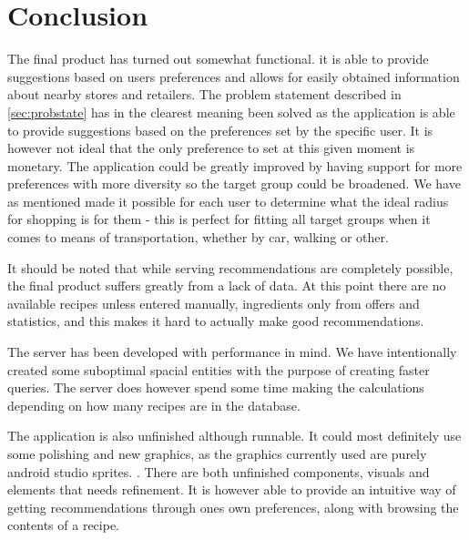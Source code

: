 \chapter{Conclusion}
\label{chap:conc}

The final product has turned out somewhat functional. it is able to provide suggestions based on users preferences and allows for easily obtained information about nearby stores and retailers. The problem statement described in \ref{sec:probstate} has in the clearest meaning been solved as the application is able to provide suggestions based on the preferences set by the specific user. It is however not ideal that the only preference to set at this given moment is monetary. The application could be greatly improved by having support for more preferences with more diversity so the target group could be broadened. We have as mentioned made it possible for each user to determine what the ideal radius for shopping is for them - this is perfect for fitting all target groups when it comes to means of transportation, whether by car, walking or other.

It should be noted that while serving recommendations are completely possible, the final product suffers greatly from a lack of data. At this point there are no available recipes unless entered manually, ingredients only from offers and statistics, and this makes it hard to actually make good recommendations.

The server has been developed with performance in mind. We have intentionally created some suboptimal spacial entities with the purpose of creating faster queries. The server does however spend some time making the calculations depending on how many recipes are in the database. 

The application is also unfinished although runnable. It could most definitely use some polishing and new graphics, as the graphics currently used are purely android studio sprites. . There are both unfinished components, visuals and elements that needs refinement. It is however able to provide an intuitive way of getting recommendations through ones own preferences, along with browsing the contents of a recipe.




